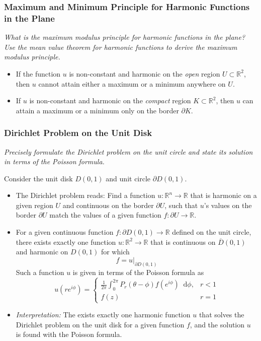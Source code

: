\documentclass[11pt, a4paper]{article}
\newcommand{\question}[1]{\textit{#1}\vspace{2mm}}
\newcommand{\R}{\mathbb{R}} %
\newcommand{\diff}{\mathop{}\!\mathrm{d}} %
\begin{document}
\subsubsection{Maximum and Minimum Principle for Harmonic Functions in the Plane}
\question{What is the maximum modulus principle for harmonic functions in the plane? Use the mean value theorem for harmonic functions to derive the maximum modulus principle.}

\begin{itemize}
	\item If the function $ u $ is non-constant and harmonic on the \textit{open} region $ U \subset \R^{2} $, then $ u $ cannot attain either a maximum or a minimum anywhere on $ U $. 
	
	\item If $ u $ is non-constant and harmonic on the \textit{compact} region $ K \subset \R^{2} $, then $ u $ can attain a maximum or a minimum only on the border $ \partial K $.
\end{itemize}


\subsubsection{Dirichlet Problem on the Unit Disk}
\question{Precisely formulate the Dirichlet problem on the unit circle and state its solution in terms of the Poisson formula.}

Consider the unit disk $ D(0, 1) $ and unit circle $ \partial D(0, 1) $.
\begin{itemize}
	
	\item The Dirichlet problem reads: Find a function $ u : \R^{n} \to \R $ that is harmonic on a given region $ U $ and continuous on the border $ \partial U $, such that $ u $'s values on the border $ \partial U $ match the values of a given function $ f : \partial U \to \R$.
	
	
	\item For a given continuous function $ f : \partial D(0, 1) \to \R$ defined on the unit circle, there exists exactly one function $ u : \R^{2} \to \R $ that is continuous on $ \overline{D}(0, 1) $ and harmonic on $ D(0, 1) $ for which
	\begin{equation*}
		f = u \big |_{\partial D(0, 1)}
	\end{equation*}
	Such a function $ u $ is given in terms of the Poisson formula as
	\[
		u(re^{i\phi}) = 
		\begin{cases}
			\displaystyle{\frac{1}{2\pi}\int_{0}^{2\pi}P_r(\theta - \phi) f(e^{i\phi})\diff \phi}, & r < 1\\[2.0mm]
			f(z) & r = 1
		\end{cases}	
	\]
	
	\item \textit{Interpretation:} The exists exactly one harmonic function $ u $ that solves the Dirichlet problem on the unit disk for a given function $ f $, and the solution $ u $ is found with the Poisson formula.
\end{itemize}
\end{document}
